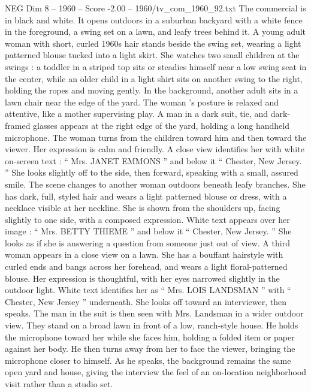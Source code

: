 \begin{textsample}{NEG Dim 8 – 1960 – Score -2.00 – 1960/tv\_com\_1960\_92.txt}  \label{ex:f8_neg_016}
The commercial is in black and white.
It opens outdoors in a suburban backyard with a white fence in the foreground, a swing set on a lawn, and leafy trees behind it.
A young adult woman with short, curled 1960s hair stands beside the swing set, wearing a light patterned blouse tucked into a light skirt.
She watches two small children at the swings : a toddler in a striped top sits or steadies himself near a low swing seat in the center, while an older child in a light shirt sits on another swing to the right, holding the ropes and moving gently.
In the background, another adult sits in a lawn chair near the edge of the yard.
The woman ’s posture is relaxed and attentive, like a mother supervising play.
A man in a dark suit, tie, and dark-framed glasses appears at the right edge of the yard, holding a long handheld microphone.
The woman turns from the children toward him and then toward the viewer.
Her expression is calm and friendly.
A close view identifies her with white on-screen text : “ Mrs.
JANET EMMONS ” and below it “ Chester, New Jersey. ” She looks slightly off to the side, then forward, speaking with a small, assured smile.
The scene changes to another woman outdoors beneath leafy branches.
She has dark, full, styled hair and wears a light patterned blouse or dress, with a necklace visible at her neckline.
She is shown from the shoulders up, facing slightly to one side, with a composed expression.
White text appears over her image : “ Mrs.
BETTY THIEME ” and below it “ Chester, New Jersey. ” She looks as if she is answering a question from someone just out of view.
A third woman appears in a close view on a lawn.
She has a bouffant hairstyle with curled ends and bangs across her forehead, and wears a light floral-patterned blouse.
Her expression is thoughtful, with her eyes narrowed slightly in the outdoor light.
White text identifies her as “ Mrs.
LOIS LANDSMAN ” with “ Chester, New Jersey ” underneath.
She looks off toward an interviewer, then speaks.
The man in the suit is then seen with Mrs.
Landsman in a wider outdoor view.
They stand on a broad lawn in front of a low, ranch-style house.
He holds the microphone toward her while she faces him, holding a folded item or paper against her body.
He then turns away from her to face the viewer, bringing the microphone closer to himself.
As he speaks, the background remains the same open yard and house, giving the interview the feel of an on-location neighborhood visit rather than a studio set.

\end{textsample}
